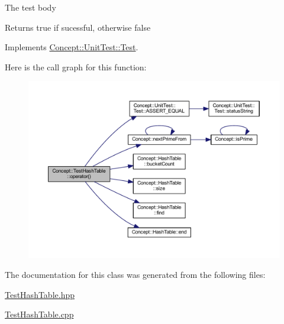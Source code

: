 The test body \begin{DoxyReturn}{Returns}
true if sucessful, otherwise false 
\end{DoxyReturn}


Implements \mbox{\hyperlink{class_concept_1_1_unit_test_1_1_test_aa8c081714f642696eeef640911be752a}{Concept\+::\+Unit\+Test\+::\+Test}}.

Here is the call graph for this function\+:\nopagebreak
\begin{figure}[H]
\begin{center}
\leavevmode
\includegraphics[width=350pt]{class_concept_1_1_test_hash_table_a64943226aff8a1ac3f3d1b875159bdfe_cgraph}
\end{center}
\end{figure}


The documentation for this class was generated from the following files\+:\begin{DoxyCompactItemize}
\item 
\mbox{\hyperlink{_test_hash_table_8hpp}{Test\+Hash\+Table.\+hpp}}\item 
\mbox{\hyperlink{_test_hash_table_8cpp}{Test\+Hash\+Table.\+cpp}}\end{DoxyCompactItemize}
